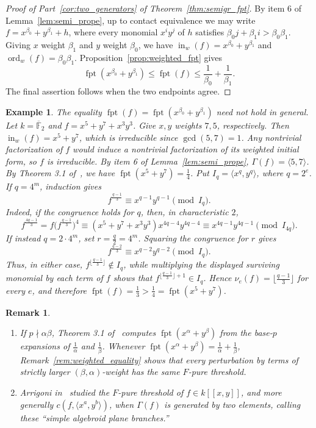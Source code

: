 \documentclass{article}
\newtheorem{example}[theorem]{Example}
\newtheorem{remark}[theorem]{Remark}
\DeclareMathOperator{\ord}{ord}
\DeclareMathOperator{\fpt}{fpt}
\numberwithin{theorem}{section}
\begin{document}
\begin{proof}[Proof of Part~\ref{cor:two_generators} of Theorem~\ref{thm:semigr_fpt}]
By item 6 of Lemma~\ref{lem:semi_prope}, up to contact equivalence we may write $f=x^{\beta_0}+y^{\beta_1}+h$, where every monomial $x^iy^j$ of $h$ satisfies $\beta_0j+\beta_1i>\beta_0\beta_1$. Giving $x$ weight $\beta_1$ and $y$ weight $\beta_0$, we have $\operatorname{in}_w(f)=x^{\beta_0}+y^{\beta_1}$ and $\ord_w(f)=\beta_0\beta_1$. Proposition~\ref{prop:weighted_fpt} gives
\[
    \fpt(x^{\beta_0}+y^{\beta_1})\leq\fpt(f)
    \leq\frac1{\beta_0}+\frac1{\beta_1}.
\]
The final assertion follows when the two endpoints agree.
\end{proof}

\begin{example}\label{ex:higher_terms_change_fpt}
\textup{The equality $\fpt(f)=\fpt(x^{\beta_0}+y^{\beta_1})$ need not hold in general. Let $k=\overline{\mathbb{F}}_2$ and $f=x^5+y^7+x^3y^3$. Give $x,y$ weights $7,5$, respectively. Then $\operatorname{in}_w(f)=x^5+y^7$, which is irreducible since $\gcd(5,7)=1$. Any nontrivial factorization of $f$ would induce a nontrivial factorization of its weighted initial form, so $f$ is irreducible. By item 6 of Lemma~\ref{lem:semi_prope}, $\Gamma(f)=\langle5,7\rangle$. By Theorem 3.1 of~\cite{hernandez2015F}, we have $\fpt(x^5+y^7)=\frac{1}{4}$. Put $I_q=\langle x^q,y^q\rangle$, where $q=2^e$. If $q=4^m$, induction gives}
\[
f^{\frac{q-1}{3}}\equiv x^{q-1}y^{q-1}\pmod{I_q}.
\]
\textup{Indeed, if the congruence holds for $q$, then, in characteristic $2$,}
\[
f^{\frac{4q-1}{3}}
=f\big(f^{\frac{q-1}{3}}\big)^4
\equiv(x^5+y^7+x^3y^3)x^{4q-4}y^{4q-4}
\equiv x^{4q-1}y^{4q-1}\pmod{I_{4q}}.
\]
\textup{If instead $q=2\cdot4^m$, set $r=\frac{q}{2}=4^m$. Squaring the congruence for $r$ gives}
\[
f^{\frac{q-2}{3}}\equiv x^{q-2}y^{q-2}\pmod{I_q}.
\]
\textup{Thus, in either case, $f^{\lfloor\frac{q-1}{3}\rfloor}\notin I_q$, while multiplying the displayed surviving monomial by each term of $f$ shows that $f^{\lfloor\frac{q-1}{3}\rfloor+1}\in I_q$. Hence $\nu_e(f)=\lfloor\frac{q-1}{3}\rfloor$ for every $e$, and therefore $\fpt(f)=\frac13>\frac14=\fpt(x^5+y^7)$.}
\end{example}

\begin{remark}
\begin{enumerate}
    \item \textup{If $p\nmid\alpha\beta$, Theorem 3.1 of~\cite{hernandez2015F} computes $\fpt(x^\alpha+y^\beta)$ from the base-$p$ expansions of $\frac{1}{\alpha}$ and $\frac{1}{\beta}$. Whenever $\fpt(x^\alpha+y^\beta)=\frac{1}{\alpha}+\frac{1}{\beta}$, Remark~\ref{rem:weighted_equality} shows that every perturbation by terms of strictly larger $(\beta,\alpha)$-weight has the same $F$-pure threshold.}
    \item \textup{Arrigoni in~\cite{arrigoni2024f} studied the $F$-pure threshold of $f\in k[[x,y]]$, and more generally $c(f,\langle x^a,y^b\rangle)$, when $\Gamma(f)$ is generated by two elements, calling these ``simple algebroid plane branches.''}
\end{enumerate}
\end{remark}
\end{document}
